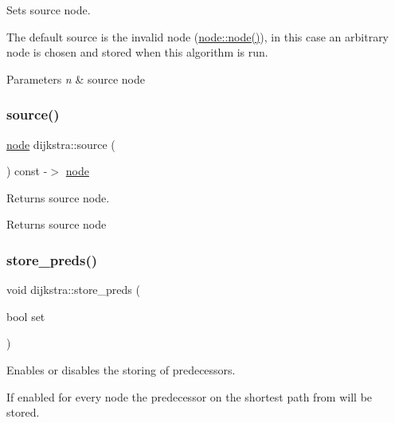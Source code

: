 Sets source node. 

The default source is the invalid node (\mbox{\hyperlink{classnode_ad603259398d5667e3b97a6322a2bcc20}{node\+::node()}}), in this case an arbitrary node is chosen and stored when this algorithm is run.


\begin{DoxyParams}{Parameters}
{\em n} & source node \\
\hline
\end{DoxyParams}
\mbox{\label{classdijkstra_a7a0b3d98168726348964fa238e247c71}} 
\subsubsection{\texorpdfstring{source()}{source()}\hspace{0.1cm}{\footnotesize\ttfamily [2/2]}}
{\footnotesize\ttfamily \mbox{\hyperlink{classnode}{node}} dijkstra\+::source (\begin{DoxyParamCaption}{ }\end{DoxyParamCaption}) const -\/$>$ \mbox{\hyperlink{classnode}{node}}}



Returns source node. 

\begin{DoxyReturn}{Returns}
source node 
\end{DoxyReturn}
\mbox{\label{classdijkstra_af79383dbbb6b737afcefd8e32350192d}} 
\subsubsection{\texorpdfstring{store\+\_\+preds()}{store\_preds()}\hspace{0.1cm}{\footnotesize\ttfamily [1/2]}}
{\footnotesize\ttfamily void dijkstra\+::store\+\_\+preds (\begin{DoxyParamCaption}\item[{bool}]{set }\end{DoxyParamCaption})}



Enables or disables the storing of predecessors. 

If enabled for every node the predecessor on the shortest path from will be stored.


